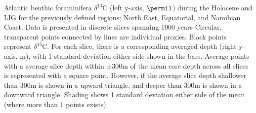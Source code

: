 Atlantic benthic foraminifera $\delta^{13}$C (left y-axis, $\permil$) during the Holocene and LIG for the previously defined regions; North East, Equatorial, and Namibian Coast. Data is presented in discrete slices spanning 1000 years Circular, transparent points connected by lines are individual proxies. Black points represent $\delta^{13}$C. For each slice, there is a corresponding averaged depth (right y-axis, m), with 1 standard deviation either side shown in the bars. Average points with a average slice depth within $\pm$300m of the mean core depth across all slices is represented with a square point. However, if the average slice depth shallower than 300m is shown in a upward triangle, and deeper than 300m is shown in a downward triangle. Shading shows 1 standard deviation either side of the mean (where more than 1 points exists)